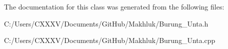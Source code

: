 The documentation for this class was generated from the following files\+:\begin{DoxyCompactItemize}
\item 
C\+:/\+Users/\+C\+X\+X\+X\+V/\+Documents/\+Git\+Hub/\+Makhluk/Burung\+\_\+\+Unta.\+h\item 
C\+:/\+Users/\+C\+X\+X\+X\+V/\+Documents/\+Git\+Hub/\+Makhluk/Burung\+\_\+\+Unta.\+cpp\end{DoxyCompactItemize}
